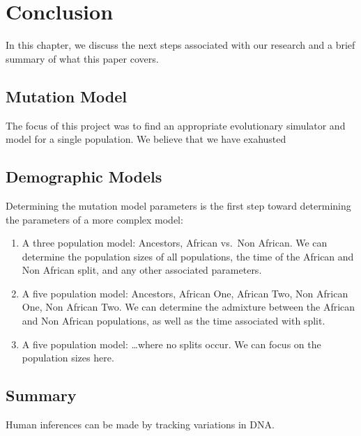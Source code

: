 \chapter{Conclusion}\label{ch:conclusion}
In this chapter, we discuss the next steps associated with our research and a brief summary of what this paper covers.

\section{Mutation Model}\label{sec:mutationModel}
The focus of this project was to find an appropriate evolutionary simulator and model for a single population.
We believe that we have exahusted

\section{Demographic Models}\label{sec:demographicModels}


Determining the mutation model parameters is the first step toward determining the parameters of a more complex model:
\begin{enumerate}
    \item A three population model: Ancestors, African vs.\ Non African.
        We can determine the population sizes of all populations, the time of the African and Non African split, and
        any other associated parameters.
    \item A five population model: Ancestors, African One, African Two, Non African One, Non African Two.
        We can determine the admixture between the African and Non African populations, as well as the time associated
        with split.
    \item A five population model: \ldots where no splits occur.
        We can focus on the population sizes here.
\end{enumerate}

\section{Summary}\label{sec:summary}
Human inferences can be made by tracking variations in DNA.

